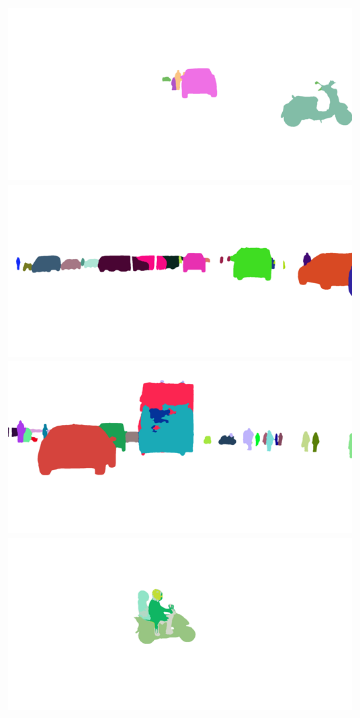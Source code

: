 {\begin{figure}[t]
{{\begin{subfigure}[t]{0.24\linewidth}
\begin{center}
		\includegraphics[width=\linewidth,trim={0px 60px 0 0px},clip]{failure/mainz_000001_044366_instance_segmentation.png}
		\includegraphics[width=\linewidth,trim={0px 60px 0 0px},clip]{failure/berlin_000001_000019_instance_segmentation.png}
		\includegraphics[width=\linewidth,trim={0px 60px 0 0px},clip]{failure/berlin_000040_000019_instance_segmentation.png}
		\includegraphics[width=\linewidth,trim={0px 60px 0 0px},clip]{failure/mainz_000001_031026_instance_segmentation.png}

\end{center}
\end{subfigure}}}
\end{figure}}
